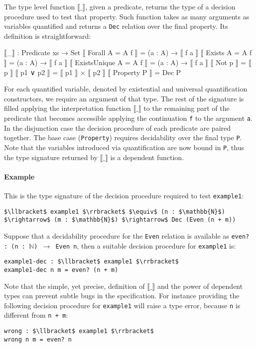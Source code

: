 \documentclass[10pt,a4paper]{article}
\begin{document}
The type level function $\llbracket\_\rrbracket$, given a predicate, returns the type of a decision procedure used to test that property.
Such function takes as many arguments as variables quantified and returns a \texttt{Dec} relation over the final property.
Its definition is straightforward:
\begin{code}
⟦_⟧ : Predicate xs → Set
⟦ Forall {A = A} f ⟧ = (a : A) → ⟦ f a ⟧
⟦ Exists {A = A} f ⟧ = (a : A) → ⟦ f a ⟧
⟦ ExistsUnique {A = A} f ⟧ = (a : A) → ⟦ f a ⟧
⟦ Not p ⟧ = ⟦ p ⟧
⟦ p1 ∨ p2 ⟧ = ⟦ p1 ⟧ × ⟦ p2 ⟧
⟦ Property P ⟧ = Dec P
\end{code}
For each quantified variable, denoted by existential and universal quantification  constructors, we require an argument of that type. 
The rest of the signature is  filled applying the  interpretation function 
$\llbracket\_\rrbracket$  to the remaining 
part of the predicate that becomes accessible applying the continuation 
\texttt{f} to the argument \texttt{a}.
In the disjunction  case the decision procedure of each predicate are paired together. The base case (\texttt{Property}) requires decidability over the final type \texttt{P}. Note that the variables introduced via quantification are now bound in \texttt{P}, thus the type signature returned by $\llbracket\_\rrbracket$ is a dependent function. 

\paragraph{Example}
This is the type signature of the decision procedure required to test \texttt{example1}:
\begin{lstlisting}
$\llbracket$ example1 $\rrbracket$ $\equiv$ (n : $\mathbb{N}$) $\rightarrow$ (m : $\mathbb{N}$) $\rightarrow$ Dec (Even (n + m))
\end{lstlisting}
Suppose that a decidability procedure for the \texttt{Even} relation is available as \texttt{even? : (n : $\mathbb{N}$) $\rightarrow$ Even n}, then a suitable decision procedure for \texttt{example1} is:
\begin{lstlisting}
example1-dec : $\llbracket$ example1 $\rrbracket$
example1-dec n m = even? (n + m)
\end{lstlisting}
Note that the simple, yet precise, definition of $\llbracket\_\rrbracket$ 
and the power of dependent types can prevent subtle bugs in the specification.
For instance providing the following decision procedure for \texttt{example1} will raise a type error, because \texttt{n} is different from \texttt{n + m}:
\begin{lstlisting}
wrong : $\llbracket$ example1 $\rrbracket$ 
wrong n m = even? n
\end{lstlisting}
\end{document}

